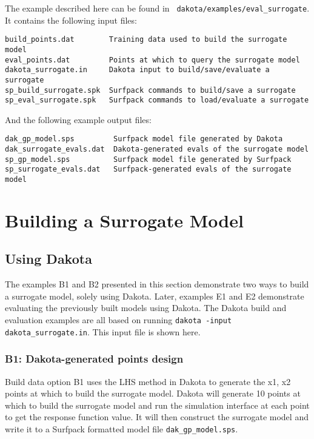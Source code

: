 \documentclass{article}
\begin{document}
The example described here can be found in {\tt
  dakota/examples/eval\_surrogate}.  It contains the following input
files:\\
\begin{bigbox}
\begin{verbatim}
build_points.dat        Training data used to build the surrogate model
eval_points.dat         Points at which to query the surrogate model
dakota_surrogate.in     Dakota input to build/save/evaluate a surrogate 
sp_build_surrogate.spk  Surfpack commands to build/save a surrogate
sp_eval_surrogate.spk   Surfpack commands to load/evaluate a surrogate
\end{verbatim}
\end{bigbox}
And the following example output files:\\
\begin{bigbox}
\begin{verbatim}
dak_gp_model.sps         Surfpack model file generated by Dakota
dak_surrogate_evals.dat  Dakota-generated evals of the surrogate model
sp_gp_model.sps          Surfpack model file generated by Surfpack
sp_surrogate_evals.dat   Surfpack-generated evals of the surrogate model
\end{verbatim}
\end{bigbox}

\section{Building a Surrogate Model}

\subsection{Using Dakota}

The examples B1 and B2 presented in this section demonstrate two ways
to build a surrogate model, solely using Dakota.  Later, examples E1
and E2 demonstrate evaluating the previously built models using
Dakota.  The Dakota build and evaluation examples are all based on
running {\tt dakota -input dakota\_surrogate.in}.  This input file is
shown here.

\hrulefill

\hrulefill

\subsubsection*{B1: Dakota-generated points design}

Build data option B1 uses the LHS method in Dakota to generate the x1,
x2 points at which to build the surrogate model.  Dakota will generate
10 points at which to build the surrogate model and run the simulation
interface at each point to get the response function value.  It will
then construct the surrogate model and write it to a Surfpack
formatted model file {\tt dak\_gp\_model.sps}.
\end{document}

